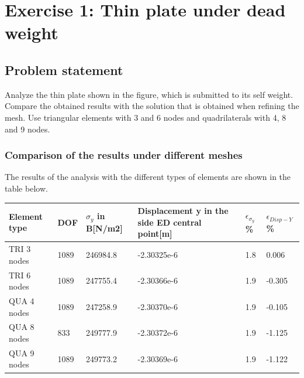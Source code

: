 \documentclass[a4paper,12pt,twoside,english]{article}
\begin{document}
\tableofcontents
\newpage
% 
\section{Exercise 1: Thin plate under dead weight}
\subsection{Problem statement}
Analyze the thin plate shown in the figure, which is submitted to its self weight. Compare the obtained results with the solution that is obtained when refining the mesh.
Use triangular elements with 3 and 6 nodes and quadrilaterals with 4, 8 and 9 nodes.
\begin{figure}[H]

\end{figure}




\subsubsection*{Comparison of the results under different meshes}
The results of the analysis with the different types of elements are shown in the table below.
\begin{center}
    \begin{tabular}{ | m{6em} | m{1cm}| m{1.5cm} |m{3.5cm} |m{1cm} |m{2cm} | } 
    \hline
        Element type & DOF& $\sigma_y$ in B[N/m2]&Displacement y in the side ED central point[m]& $\epsilon_{\sigma_y}$\%&$\epsilon_{Disp-Y}$\% \\ \hline
        TRI 3 nodes& 1089& 246984.8& -2.30325e-6  & 1.8 &0.006  \\\hline
        TRI 6 nodes& 1089& 247755.4& -2.30366e-6   & 1.9 &-0.305\\\hline
        QUA 4 nodes& 1089& 247258.9& -2.30370e-6   & 1.9 & -0.105 \\\hline
        QUA 8 nodes& 833 & 249777.9& -2.30372e-6   & 1.9 & -1.125 \\\hline
        QUA 9 nodes& 1089& 249773.2& -2.30369e-6   & 1.9 &  -1.122 \\
    \hline
    \end{tabular}
\end{center}
\end{document}

